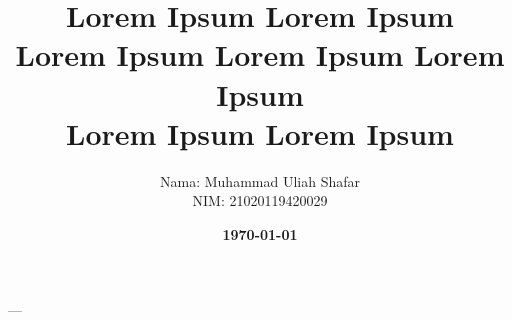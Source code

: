 \documentclass[11pt]{simart} %
\title{
\textbf{Lorem Ipsum Lorem Ipsum \\
Lorem Ipsum Lorem Ipsum Lorem Ipsum} \\
\textbf{{Lorem Ipsum Lorem Ipsum \\}}
} %
\date{\textbf{\today}}
\author{
\begin{tabular}{@{}ll@{}}
	Nama & : Muhammad Uliah Shafar\\
	NIM & : 21020119420029\\
\end{tabular}
}
\begin{document}
% 

% 
% 
% 
% 
% 


---




\end{document}
